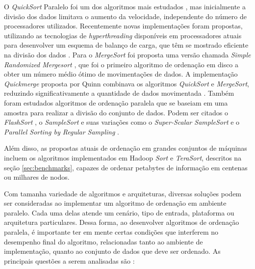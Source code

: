 O \textit{QuickSort} Paralelo foi um dos algoritmos mais estudados \cite{Deminet:1982, Quinn:1994, Sanders:1997}, mas inicialmente a divisão dos dados limitava o aumento da velocidade, independente do número de processadores utilizados. Recentemente novas implementações foram propostas, utilizando as tecnologias  de \textit{hyperthreading} disponíveis em processadores atuais para desenvolver um esquema de balanço de carga, que têm se mostrado eficiente na divisão dos dados \cite{Parikh:2008}.
Para o \textit{MergeSort} foi proposta uma versão chamada \textit{Simple Randomized Mergesort} \cite{Barve:1996, Barve:2002}, que foi o primeiro algoritmo de ordenação em disco a obter um número médio ótimo de movimentações de dados. 
 A implementação \textit{Quickmerge} proposta por Quinn combinava os algoritmos \textit{QuickSort} e \textit{MergeSort}, reduzindo significativamente a quantidade de dados movimentada \cite{Quinn:1988}. Também foram estudados algoritmos de ordenação paralela que se baseiam em uma amostra para realizar a divisão do conjunto de dados. Podem ser citados o \textit{FlashSort} \cite{Reif:1987}, o \textit{SampleSort} \cite{Huang:1983} e suas variações como o \textit{Super-Scalar SampleSort }\cite{Sanders:2004} e o \textit{Parallel Sorting by Regular Sampling} \cite{Shi:1992}.

Além disso, as propostas atuais de ordenação em grandes conjuntos de máquinas incluem os algoritmos implementados em Hadoop \textit{Sort} e \textit{TeraSort}, descritos na seção \ref{sec:benchmarks}, capazes de ordenar petabytes de informação em centenas ou milhares de nodos. 



Com tamanha variedade de algoritmos e arquiteturas, diversas soluções podem ser consideradas ao implementar um algoritmo de ordenação em ambiente paralelo. Cada uma delas atende um cenário, tipo de entrada, plataforma ou arquitetura particulares. Dessa forma, ao desenvolver algoritmos de ordenação paralela, é importante ter em mente certas condições que interferem no desempenho final do algoritmo, relacionadas tanto ao ambiente de implementação, quanto ao conjunto de dados que deve ser ordenado. As principais questões a serem analisadas são \cite{Kale:2010}:

